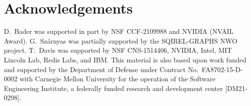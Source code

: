 \section*{Acknowledgements}

D.~Bader was supported in part by NSF CCF-2109988 and NVIDIA (NVAIL Award).
G.~Sz\'arnyas was partially supported by the SQIREL-GRAPHS NWO project.
T.~Davis was supported by NSF CNS-1514406, NVIDIA, Intel, MIT Lincoln Lab,
Redis Labs, and IBM.
This material is also based upon work funded and supported by the Department of
Defense under Contract No.~FA8702-15-D-0002 with Carnegie Mellon University for
the operation of the Software Engineering Institute, a federally funded research
and development center [DM21-0298].


